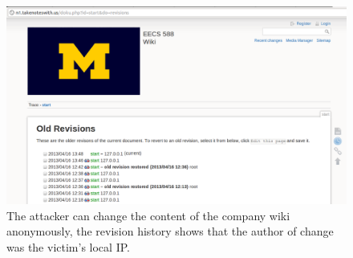\begin{figure}[h]
\centering
\includegraphics[width=0.8\columnwidth]{oldrevisions.png}
\caption{The attacker can change the content of the company wiki anonymously, the revision history shows that the author of change was the victim's local IP.}
\label{fig:oldrevisions}
\end{figure}

